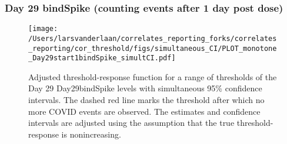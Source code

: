 \documentclass[]{article}
\begin{document}
\clearpage
\clearpage

\clearpage

\hypertarget{day-29-bindspike-counting-events-after-1-day-post-dose-2}{%
\subsubsection{Day 29 bindSpike (counting events after 1 day post
dose)}\label{day-29-bindspike-counting-events-after-1-day-post-dose-2}}

\begin{figure}[H]
\centering
\texttt{[image: /Users/larsvanderlaan/correlates\_reporting\_forks/correlates\_reporting/cor\_threshold/figs/simultaneous\_CI/PLOT\_monotone\_Day29start1bindSpike\_simultCI.pdf]}
\caption{Adjusted threshold-response function for a range of thresholds of the
  Day 29 Day29bindSpike levels with simultaneous 95\% confidence intervals. The dashed red line marks the threshold after which no more COVID events are observed. The estimates and confidence intervals are adjusted using the assumption that the true threshold-response is nonincreasing.}
\end{figure}
\end{document}
